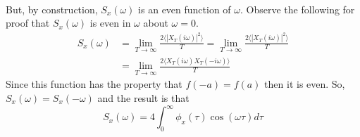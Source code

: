 \begin{homeworkProblem}
\begin{align*}
\end{align*}
But, by construction, $ S_{x}(\omega) $ is an even function of $
\omega$. Observe the following for proof that $ S_{x}(\omega) $ is even in $
\omega $ about $ \omega = 0 $.
\begin{align*}
S_{x}(\omega) &=
   \lim_{T \to \infty} \frac{2 \langle |X_{T}(i\omega)|^2 \rangle}{T} = \lim_{T
   \to \infty} \frac{2 \langle |X_{T}(i\omega)|^2 \rangle}{T} \\
   &= \lim_{T \to \infty}\frac{2 \langle X_{T}(i\omega) X_{T}(- i \omega)
   \rangle }{T}
\end{align*}
   Since this function has the property that $ f(-a) = f(a) $ then it is even.
   So, $ S_{x}(\omega) = S_{x}(-\omega) $ and the result is that
\[
    S_{x}(\omega) = 4 \int_{0}^{\infty}  \phi_{x}(\tau)
    \cos(\omega \tau) d\tau
\]
 \end{homeworkProblem}
